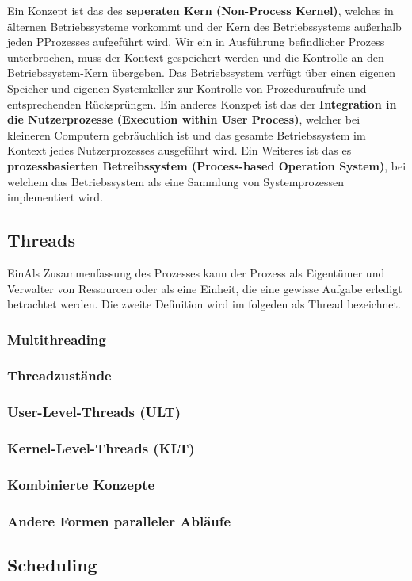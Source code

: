 \documentclass{article}
\begin{document}
    Ein Konzept ist das des \textbf{seperaten Kern (Non-Process Kernel)}, welches in älternen Betriebssysteme vorkommt und der Kern des Betriebssystems außerhalb jeden PProzesses aufgeführt wird. Wir ein in Ausführung befindlicher Prozess unterbrochen, muss der Kontext gespeichert werden und die Kontrolle an den Betriebssystem-Kern übergeben. Das Betriebssystem verfügt über einen eigenen Speicher und eigenen Systemkeller zur Kontrolle von Prozeduraufrufe und entsprechenden Rücksprüngen. Ein anderes Konzpet ist das der \textbf{Integration in die Nutzerprozesse (Execution within User Process)}, welcher bei kleineren  Computern gebräuchlich ist und das gesamte Betriebssystem im Kontext jedes Nutzerprozesses ausgeführt wird. Ein Weiteres ist das es \textbf{prozessbasierten Betreibssystem (Process-based Operation System)}, bei welchem das Betriebssystem als eine Sammlung von Systemprozessen implementiert wird.   
\subsection{Threads}
    EinAls Zusammenfassung des Prozesses kann der Prozess als Eigentümer und Verwalter von Ressourcen oder als eine Einheit, die eine gewisse Aufgabe erledigt betrachtet werden. Die zweite Definition wird im folgeden als Thread bezeichnet. 
\subsubsection{Multithreading}
    
\subsubsection{Threadzustände}
\subsubsection{User-Level-Threads (ULT)}
\subsubsection{Kernel-Level-Threads (KLT)}
\subsubsection{Kombinierte Konzepte}
\subsubsection{Andere Formen paralleler Abläufe}
\subsection{Scheduling}
\end{document}
